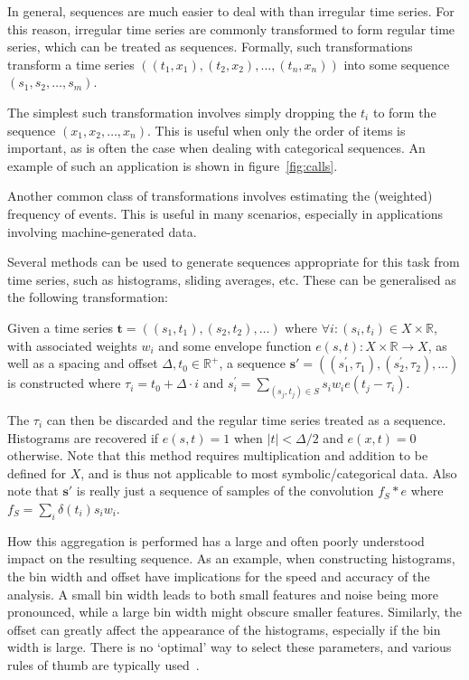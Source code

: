 In general, sequences are much easier to deal with than irregular time series. For this reason, irregular time series are commonly transformed to form regular time series, which can be treated as sequences. Formally, such transformations transform a time series $((t_1, x_1), (t_2, x_2), \ldots, (t_n, x_n))$ into some sequence $(s_1, s_2, \ldots, s_m)$.

The simplest such transformation involves simply dropping the $t_i$ to form the sequence $(x_1, x_2, \ldots, x_n)$. This is useful when only the order of items is important, as is often the case when dealing with categorical sequences. An example of such an application is shown in figure~\ref{fig:calls}.

Another common class of transformations involves estimating the (weighted) frequency of events. This is useful in many scenarios, especially in applications involving machine-generated data.

Several methods can be used to generate sequences appropriate for this task from time series, such as histograms, sliding averages, etc. These can be generalised as the following transformation:

Given a time series $\mathbf{t} = ((s_1, t_1), (s_2, t_2), \dots)$ where $\forall i: (s_i, t_i) \in X \times \mathbb{R}$, with associated weights $w_i$ and some envelope function $e(s, t): X \times \mathbb{R} \rightarrow X$, as well as a spacing and offset $\Delta, t_0 \in \mathbb{R}^+$, a sequence $\mathbf{s}' = ((s_{1}^{'}, \tau_1), (s_{2}^{'}, \tau_2), \dots)$ is constructed where $\tau_i = t_0 + \Delta \cdot i$ and $s_{i}^{'} = \sum_{(s_j, t_j) \in S} s_i w_i e(t_j - \tau_i)$.

The $\tau_i$ can then be discarded and the regular time series treated as a sequence. Histograms are recovered if $e(s, t) = 1$ when $|t| < \Delta/2$ and $e(x, t) = 0$ otherwise. Note that this method requires multiplication and addition to be defined for $X$, and is thus not applicable to most symbolic/categorical data. Also note that $\mathbf{s}'$ is really just a sequence of samples of the convolution $f_S \ast e$ where $f_S = \sum_i \delta(t_i) s_i w_i$.

How this aggregation is performed has a large and often poorly understood impact on the resulting sequence. As an example, when constructing histograms, the bin width and offset have implications for the speed and accuracy of the analysis. A small bin width leads to both small features and noise being more pronounced, while a large bin width might obscure smaller features. Similarly, the offset can greatly affect the appearance of the histograms, especially if the bin width is large. There is no `optimal' way to select these parameters, and various rules of thumb are typically used~\cite{density_estimation}.

